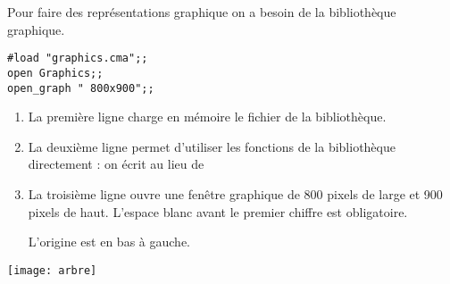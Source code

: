 \medskip

Pour faire des représentations graphique on a besoin de la bibliothèque graphique.
\begin{lstlisting}
#load "graphics.cma";;
open Graphics;;
open_graph " 800x900";;
\end{lstlisting}
\begin{enumerate}
  \item La première ligne charge en mémoire le fichier de la bibliothèque.
  \item La deuxième ligne permet d'utiliser les fonctions de la bibliothèque directement : on écrit  au lieu de 
  \item La troisième ligne ouvre une fenêtre graphique de 800 pixels de large et 900 pixels de haut. L'espace blanc avant le premier chiffre est obligatoire.
  
  L'origine est en bas à gauche.
\end{enumerate}
\begin{minipage}{0.5\textwidth}
\vspace{0pt}
\end{minipage}
\begin{minipage}{0.50\textwidth}
\vspace{0pt}
\texttt{[image: arbre]}
\end{minipage}
\medskip

